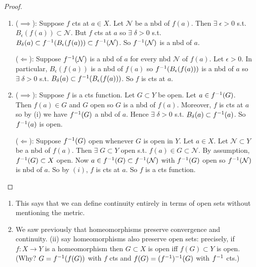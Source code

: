 \begin{proof} \
    \begin{enumerate}
        \item ($\implies$): Suppose $f$ cts at $a \in X$.
        Let $\mathcal{N}$ be a nbd of $f(a)$.
        Then $\exists \; \epsilon > 0$ s.t. $B_\epsilon(f(a)) \subset \mathcal{N}$.
        But $f$ cts at $a$ so $\exists \; \delta > 0$ s.t. $B_\delta(a) \subset f^{-1} (B_\epsilon(f(a))) \subset f^{-1} (\mathcal{N})$.
        So $f^{-1}(\mathcal{N})$ is a nbd of $a$.

        ($\Longleftarrow$): Suppose $f^{-1}(\mathcal{N})$ is a nbd of $a$ for every nbd $\mathcal{N}$ of $f(a)$.
        Let $\epsilon > 0$.
        In particular, $B_\epsilon(f(a))$ is a nbd of $f(a)$ so $f^{-1}(B_\epsilon(f(a)))$ is a nbd of $a$ so $\exists \; \delta > 0$ s.t. $B_\delta(a) \subset f^{-1} (B_\epsilon (f(a)))$.
        So $f$ is cts at $a$.

        \item ($\implies$): Suppose $f$ is a cts function.
        Let $G \subset Y$ be open.
        Let $a \in f^{-1}(G)$.
        Then $f(a) \in G$ and $G$ open so $G$ is a nbd of $f(a)$.
        Moreover, $f$ is cts at $a$ so by (i) we have $f^{-1}(G)$ a nbd of $a$.
        Hence $\exists \; \delta > 0$ s.t. $B_\delta(a) \subset f^{-1}(a)$.
        So $f^{-1}(a)$ is open.

        ($\Longleftarrow$): Suppose $f^{-1}(G)$ open whenever $G$ is open in $Y$.
        Let $a \in X$.
        Let $\mathcal{N} \subset Y$ be a nbd of $f(a)$.
        Then $\exists \; G \subset Y$ open s.t. $f(a) \in G \subset \mathcal{N}$.
        By assumption, $f^{-1}(G) \subset X$ open.
        Now $a \in f^{-1}(G) \subset f^{-1}(\mathcal{N})$ with $f^{-1}(G)$ open so $f^{-1}(\mathcal{N})$ is nbd of $a$.
        So by $(i)$, $f$ is cts at $a$.
        So $f$ is a cts function.
    \end{enumerate} 
\end{proof} 

\begin{remark}
    \begin{enumerate}
        \item This says that we can define continuity entirely in terms of open sets without mentioning the metric.
        \item We saw previously that homeomorphisms preserve convergence and continuity.
        \Cref{prp:23} (ii) say homeomorphisms also preserve open sets: precisely, if $f : X \to Y$ is a homeomorphism then $G \subset X$ is open iff $f(G) \subset Y$ is open.
        (Why? $G = f^{-1}(f(G))$ with $f$ cts and $f(G) = (f^{-1})^{-1}(G)$ with $f^{-1}$ cts.)
    \end{enumerate} 
\end{remark} 

